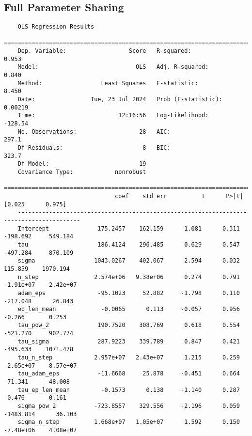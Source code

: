 \subsection{Full Parameter Sharing}
\label{tab:anova_fups}
\begin{verbatim}
    OLS Regression Results                            
    ==============================================================================
    Dep. Variable:                  Score   R-squared:                       0.953
    Model:                            OLS   Adj. R-squared:                  0.840
    Method:                 Least Squares   F-statistic:                     8.450
    Date:                Tue, 23 Jul 2024   Prob (F-statistic):            0.00219
    Time:                        12:16:56   Log-Likelihood:                -128.54
    No. Observations:                  28   AIC:                             297.1
    Df Residuals:                       8   BIC:                             323.7
    Df Model:                          19                                         
    Covariance Type:            nonrobust                                         
    ========================================================================================
                                coef    std err          t      P>|t|      [0.025      0.975]
    ----------------------------------------------------------------------------------------
    Intercept              175.2457    162.159      1.081      0.311    -198.692     549.184
    tau                    186.4124    296.485      0.629      0.547    -497.284     870.109
    sigma                 1043.0267    402.067      2.594      0.032     115.859    1970.194
    n_step                2.574e+06   9.38e+06      0.274      0.791   -1.91e+07    2.42e+07
    adam_eps               -95.1023     52.882     -1.798      0.110    -217.048      26.843
    ep_len_mean             -0.0065      0.113     -0.057      0.956      -0.266       0.253
    tau_pow_2              190.7520    308.769      0.618      0.554    -521.270     902.774
    tau_sigma              287.9223    339.789      0.847      0.421    -495.633    1071.478
    tau_n_step            2.957e+07   2.43e+07      1.215      0.259   -2.65e+07    8.57e+07
    tau_adam_eps           -11.6668     25.878     -0.451      0.664     -71.341      48.008
    tau_ep_len_mean         -0.1573      0.138     -1.140      0.287      -0.476       0.161
    sigma_pow_2           -723.8557    329.556     -2.196      0.059   -1483.814      36.103
    sigma_n_step          1.668e+07   1.05e+07      1.592      0.150   -7.48e+06    4.08e+07

\end{verbatim}
